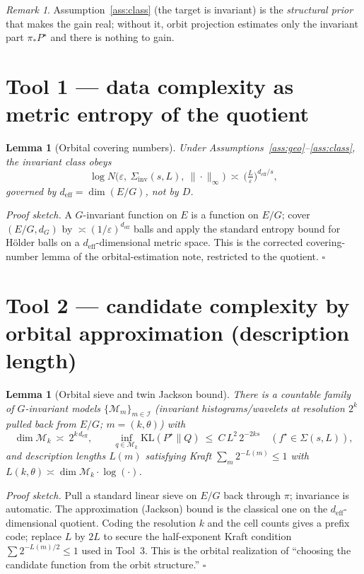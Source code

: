 \documentclass[11pt]{article}
\theoremstyle{plain}
\newtheorem{lemma}[theorem]{Lemma}
\theoremstyle{definition}
\theoremstyle{remark}
\newtheorem{remark}[theorem]{Remark}
\newcommand{\KL}{\mathrm{KL}}
\DeclareMathOperator{\dimm}{dim}
\begin{document}
\begin{remark}
Assumption~\ref{ass:class} (the target is invariant) is the \emph{structural
prior} that makes the gain real; without it, orbit projection estimates only the
invariant part $\pi_*P^\star$ and there is nothing to gain.
\end{remark}

\section{Tool 1 --- data complexity as metric entropy of the quotient}

\begin{lemma}[Orbital covering numbers]\label{lem:cov}
Under Assumptions~\ref{ass:geo}--\ref{ass:class}, the invariant class obeys
\[
\log N\big(\varepsilon,\ \Sigma_{\mathrm{inv}}(s,L),\ \|\cdot\|_\infty\big)
\ \asymp\ \Big(\tfrac{L}{\varepsilon}\Big)^{d_{\mathrm{eff}}/s},
\]
governed by $d_{\mathrm{eff}}=\dimm(E/G)$, not by $D$.
\end{lemma}

\noindent\emph{Proof sketch.} A $G$-invariant function on $E$ is a function on
$E/G$; cover $(E/G,d_G)$ by $\asymp(1/\varepsilon)^{d_{\mathrm{eff}}}$ balls and
apply the standard entropy bound for H\"older balls on a
$d_{\mathrm{eff}}$-dimensional metric space. This is the corrected covering-number
lemma of the orbital-estimation note, restricted to the quotient. \hfill$\square$

\section{Tool 2 --- candidate complexity by orbital approximation (description length)}

\begin{lemma}[Orbital sieve and twin Jackson bound]\label{lem:sieve}
There is a countable family of $G$-invariant models $\{\mathcal M_m\}_{m\in\mathcal I}$
(invariant histograms/wavelets at resolution $2^k$ pulled back from $E/G$;
$m=(k,\theta)$) with
\[
\dimm\mathcal M_k\ \asymp\ 2^{k\,d_{\mathrm{eff}}},\qquad
\inf_{q\in\mathcal M_k}\KL(P^\star\|Q)\ \le\ C\,L^2\,2^{-2ks}
\quad(f^\star\in\Sigma(s,L)),
\]
and description lengths $L(m)$ satisfying Kraft $\sum_m 2^{-L(m)}\le1$ with
$L(k,\theta)\asymp \dimm\mathcal M_k\cdot\log(\cdot)$.
\end{lemma}

\noindent\emph{Proof sketch.} Pull a standard linear sieve on $E/G$ back through
$\pi$; invariance is automatic. The approximation (Jackson) bound is the
classical one on the $d_{\mathrm{eff}}$-dimensional quotient. Coding the
resolution $k$ and the cell counts gives a prefix code; replace $L$ by $2L$ to
secure the half-exponent Kraft condition $\sum 2^{-L(m)/2}\le1$ used in
Tool~3. This is the orbital realization of ``choosing the candidate function from
the orbit structure.'' \hfill$\square$
\end{document}
